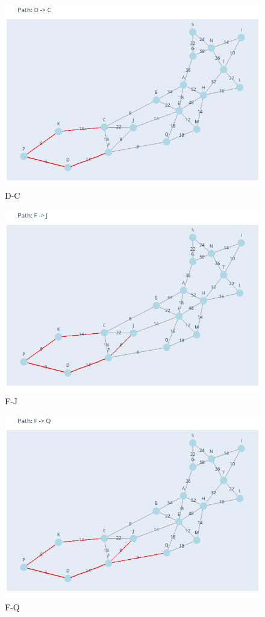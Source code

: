 \documentclass[11pt]{book}
\renewcommand{\=}[1]{\stackrel{#1}{=}} %
\theoremstyle{definition}
\theoremstyle{remark}
\begin{document}
\begin{figure}
    \centering
    \includegraphics[width=0.7\linewidth]{MSTpath/4.png}
    \caption{D-C}
    \label{fig:enter-label}
\end{figure}
\begin{figure}
    \centering
    \includegraphics[width=0.7\linewidth]{MSTpath/5.png}
    \caption{F-J}
    \label{fig:enter-label}
\end{figure}
\begin{figure}
    \centering
    \includegraphics[width=0.7\linewidth]{MSTpath/6.png}
    \caption{F-Q}
    \label{fig:enter-label}
\end{figure}
\end{document}
